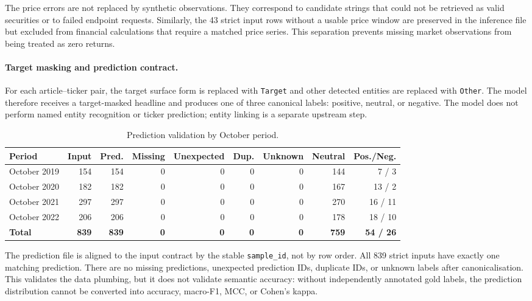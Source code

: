 \documentclass[12pt,a4paper]{article}
\begin{document}
The price errors are not replaced by synthetic observations. They correspond to candidate strings that could not be retrieved as valid securities or to failed endpoint requests. Similarly, the 43 strict input rows without a usable price window are preserved in the inference file but excluded from financial calculations that require a matched price series. This separation prevents missing market observations from being treated as zero returns.

\paragraph{Target masking and prediction contract.}
For each article--ticker pair, the target surface form is replaced with \texttt{Target} and other detected entities are replaced with \texttt{Other}. The model therefore receives a target-masked headline and produces one of three canonical labels: positive, neutral, or negative. The model does not perform named entity recognition or ticker prediction; entity linking is a separate upstream step.

\begin{table}[htbp]
\centering
\small
\caption{Prediction validation by October period.}
\label{tab:multi-year-prediction-validation}
\begin{tabular}{lrrrrrrrr}
\toprule
\textbf{Period} & \textbf{Input} & \textbf{Pred.} & \textbf{Missing} & \textbf{Unexpected} & \textbf{Dup.} & \textbf{Unknown} & \textbf{Neutral} & \textbf{Pos./Neg.} \\
\midrule
October 2019 & 154 & 154 & 0 & 0 & 0 & 0 & 144 & 7 / 3 \\
October 2020 & 182 & 182 & 0 & 0 & 0 & 0 & 167 & 13 / 2 \\
October 2021 & 297 & 297 & 0 & 0 & 0 & 0 & 270 & 16 / 11 \\
October 2022 & 206 & 206 & 0 & 0 & 0 & 0 & 178 & 18 / 10 \\
\midrule
\textbf{Total} & \textbf{839} & \textbf{839} & \textbf{0} & \textbf{0} & \textbf{0} & \textbf{0} & \textbf{759} & \textbf{54 / 26} \\
\bottomrule
\end{tabular}
\end{table}

The prediction file is aligned to the input contract by the stable \texttt{sample\_id}, not by row order. All 839 strict inputs have exactly one matching prediction. There are no missing predictions, unexpected prediction IDs, duplicate IDs, or unknown labels after canonicalisation. This validates the data plumbing, but it does not validate semantic accuracy: without independently annotated gold labels, the prediction distribution cannot be converted into accuracy, macro-F1, MCC, or Cohen's kappa.
\end{document}
